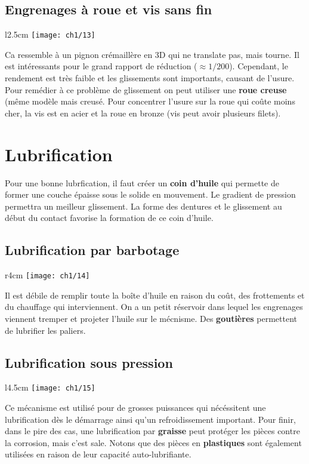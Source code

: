 \subsection{Engrenages à roue et vis sans fin}
	\begin{wrapfigure}[6]{l}{2.5cm}
	\vspace{-5mm}
	\texttt{[image: ch1/13]}
	\end{wrapfigure}	
	\noindent Ca ressemble à un pignon crémaillère en 3D qui ne translate pas, mais tourne. Il est intéressants pour le grand rapport de réduction ($\approx 1/200$). Cependant, le rendement est très faible et les glissements sont importants, causant de l'usure. Pour remédier à ce problème de glissement on peut utiliser une \textbf{roue creuse} (même modèle mais creusé. Pour concentrer l'usure sur la roue qui coûte moins cher, la vis est en acier et la roue en bronze (vis peut avoir plusieurs filets). \\
	
\section{Lubrification}
\noindent Pour une bonne lubrfication, il faut créer un \textbf{coin d'huile} qui permette de former une couche épaisse sous le solide en mouvement. Le gradient de pression permettra un meilleur glissement. La forme des dentures et le glissement au début du contact favorise la formation de ce coin d'huile. 

\subsection{Lubrification par barbotage}
	\begin{wrapfigure}[5]{r}{4cm}
	\vspace{-5mm}
	\texttt{[image: ch1/14]}
	\end{wrapfigure}	
	\noindent Il est débile de remplir toute la boîte d'huile en raison du coût, des frottements et du chauffage qui interviennent. On a un petit réservoir dans lequel les engrenages viennent tremper et projeter l'huile sur le mécnisme. Des \textbf{goutières} permettent de lubrifier les paliers. 
	
\subsection{Lubrification sous pression}
	\begin{wrapfigure}[6]{l}{4.5cm}
	\vspace{-5mm}
	\texttt{[image: ch1/15]}
	\end{wrapfigure}	
	\noindent Ce mécanisme est utilisé pour de grosses puissances qui nécéssitent une lubrification dès le démarrage ainsi qu'un refroidissement important. Pour finir, dans le pire des cas, une lubrification par \textbf{graisse} peut protéger les pièces contre la corrosion, mais c'est sale. Notons que des pièces en \textbf{plastiques} sont également utilisées en raison de leur capacité auto-lubrifiante.
	
